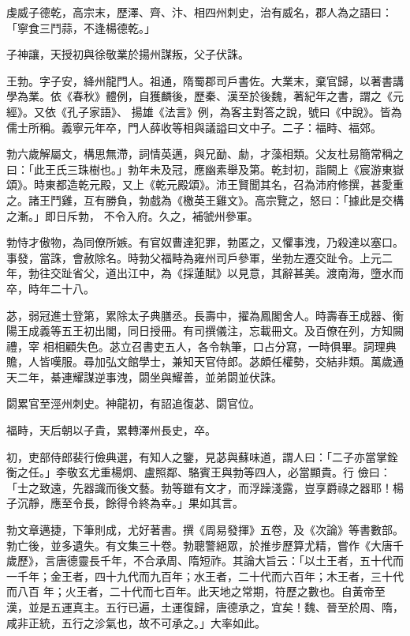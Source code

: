 \begin{pinyinscope}
 虔威子德乾，高宗末，歷澤、齊、汴、相四州刺史，治有威名，郡人為之語曰：「寧食三鬥蒜，不逢楊德乾。」



 子神讓，天授初與徐敬業於揚州謀叛，父子伏誅。



 王勃。字子安，絳州龍門人。祖通，隋蜀郡司戶書佐。大業末，棄官歸，以著書講學為業。依《春秋》體例，自獲麟後，歷秦、漢至於後魏，著紀年之書，謂之《元經》。又依《孔子家語》、
 揚雄《法言》例，為客主對答之說，號曰《中說》。皆為儒士所稱。義寧元年卒，門人薛收等相與議謚曰文中子。二子：福畤、福郊。



 勃六歲解屬文，構思無滯，詞情英邁，與兄勔、勮，才藻相類。父友杜易簡常稱之曰：「此王氏三珠樹也。」勃年未及冠，應幽素舉及第。乾封初，詣闕上《宸游東嶽頌》。時東都造乾元殿，又上《乾元殿頌》。沛王賢聞其名，召為沛府修撰，甚愛重之。諸王鬥雞，互有勝負，勃戲為《檄英王雞文》。高宗覽之，怒曰：「據此是交構之漸。」即日斥勃，
 不令入府。久之，補虢州參軍。



 勃恃才傲物，為同僚所嫉。有官奴曹達犯罪，勃匿之，又懼事洩，乃殺達以塞口。事發，當誅，會赦除名。時勃父福畤為雍州司戶參軍，坐勃左遷交趾令。上元二年，勃往交趾省父，道出江中，為《採蓮賦》以見意，其辭甚美。渡南海，墮水而卒，時年二十八。



 苾，弱冠進士登第，累除太子典膳丞。長壽中，擢為鳳閣舍人。時壽春王成器、衡陽王成義等五王初出閣，同日授冊。有司撰儀注，忘載冊文。及百僚在列，方知闕禮，宰
 相相顧失色。苾立召書吏五人，各令執筆，口占分寫，一時俱畢。詞理典贍，人皆嘆服。尋加弘文館學士，兼知天官侍郎。苾頗任權勢，交結非類。萬歲通天二年，綦連耀謀逆事洩，閟坐與耀善，並弟閟並伏誅。



 閟累官至涇州刺史。神龍初，有詔追復苾、閟官位。



 福畤，天后朝以子貴，累轉澤州長史，卒。



 初，吏部侍郎裴行儉典選，有知人之鑒，見苾與蘇味道，謂人曰：「二子亦當掌銓衡之任。」李敬玄尤重楊炯、盧照鄰、駱賓王與勃等四人，必當顯貴。行
 儉曰：「士之致遠，先器識而後文藝。勃等雖有文才，而浮躁淺露，豈享爵祿之器耶！楊子沉靜，應至令長，餘得令終為幸。」果如其言。



 勃文章邁捷，下筆則成，尤好著書。撰《周易發揮》五卷，及《次論》等書數部。勃亡後，並多遺失。有文集三十卷。勃聰警絕眾，於推步歷算尤精，嘗作《大唐千歲歷》，言唐德靈長千年，不合承周、隋短祚。其論大旨云：「以土王者，五十代而一千年；金王者，四十九代而九百年；水王者，二十代而六百年；木王者，三十代而八百
 年；火王者，二十代而七百年。此天地之常期，符歷之數也。自黃帝至漢，並是五運真主。五行已遍，土運復歸，唐德承之，宜矣！魏、晉至於周、隋，咸非正統，五行之沴氣也，故不可承之。」大率如此。




\end{pinyinscope}
